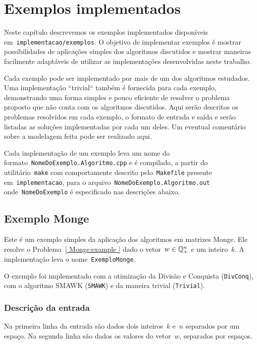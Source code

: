 \chapter{Exemplos implementados}
\label{Exemplos}

Neste capítulo descrevemos os exemplos implementados disponíveis em~\texttt{implementacao/exemplos}. O objetivo de implementar exemplos é mostrar possibilidades de aplicações simples dos algoritmos discutidos e mostrar maneiras facilmente adaptáveis de utilizar as implementações desenvolvidas neste trabalho.

Cada exemplo pode ser implementado por mais de um dos algoritmos estudados. Uma implementação ``trivial`` também é fornecida para cada exemplo, demonstrando uma forma simples e pouco eficiente de resolver o problema proposto que não conta com os algoritmos discutidos. Aqui serão descritos os problemas resolvidos em cada exemplo, o formato de entrada e saída e serão listadas as soluções implementadas por cada um deles. Um eventual comentário sobre a modelagem feita pode ser realizado aqui.

Cada implementação de um exemplo leva um nome do formato~\texttt{NomeDoExemplo.Algoritmo.cpp} e é compilado, a partir do utilitário~\texttt{make} com comportamente descrito pelo~\texttt{Makefile} presente em~\texttt{implementacao}, para o arquivo~\texttt{NomeDoExemplo.Algoritmo.out} onde~\texttt{NomeDoExemplo} é especificado nas descrições abaixo.


\section{Exemplo Monge} \label{ExemploMonge}

Este é um exemplo simples da aplicação dos algoritmos em matrizes Monge. Ele resolve o Problema~\ref{ Monge:example } dado o vetor~$w \in \mathbb{Q}^{n}_+$ e um inteiro~$k$. A implementação leva o nome~\texttt{ExemploMonge}.

O exemplo foi implementado com a otimização da Divisão e Conquista (\texttt{DivConq}), com o algoritmo SMAWK (\texttt{SMAWK}) e da maneira trivial (\texttt{Trivial}).

\subsection*{Descrição da entrada}
Na primeira linha da entrada são dados dois inteiros~$k$ e~$n$ separados por um espaço. Na segunda linha são dados os valores do vetor~$w$, separados por espaços.

